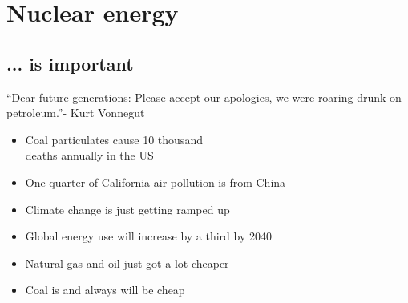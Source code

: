 \documentclass{beamer}
\begin{document}
\section{Nuclear energy}

    \subsection{... is important}

        \begin{frame}{``Dear future generations: Please accept our apologies, we were roaring drunk on petroleum.''}{- Kurt Vonnegut}

            \begin{itemize}

                \item Coal particulates cause 10 thousand \\ deaths annually in the US
                \pause
                \item One quarter of California air pollution is from China
                \pause
                \item Climate change is just getting ramped up
                \pause

                \vspace{2em}

                \item Global energy use will increase by a third by 2040
                \pause
                \item Natural gas and oil just got a lot cheaper
                \pause
                \item Coal is and always will be cheap

            \end{itemize}

        \end{frame}
\end{document}
